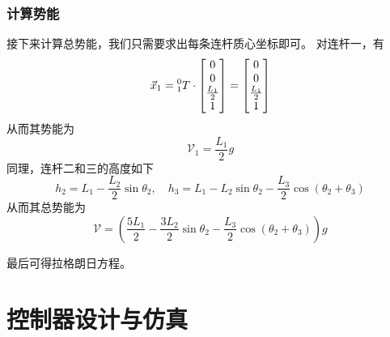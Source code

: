 \documentclass{ctexart}
\begin{document}
\subsubsection{计算势能}

接下来计算总势能，我们只需要求出每条连杆质心坐标即可。
对连杆一，有
\[
    \vec x_1 = \prescript{0}{1}{T} \cdot \begin{bmatrix}
        0 \\ 0 \\ \frac{L_1}{2} \\ 1
    \end{bmatrix} = \begin{bmatrix}
        0 \\ 0 \\ \frac{L_1}{2} \\ 1
    \end{bmatrix}
\]
从而其势能为
\[
    \mathcal V_1 = \frac{L_1}{2} g
\]
同理，连杆二和三的高度如下
\[
    h_2 = L_1 - \frac{L_2}{2} \sin \theta_2,\quad h_3 = L_1 - L_2 \sin \theta_2 - \frac{L_3}{2} \cos(\theta_2+\theta_3)
\]
从而其总势能为
\[
    \mathcal V = (\frac{5L_1}{2} - \frac{3L_2}{2} \sin \theta_2 - \frac{L_3}{2} \cos(\theta_2+\theta_3))g
\]

最后可得拉格朗日方程。

\section{控制器设计与仿真}
\end{document}

